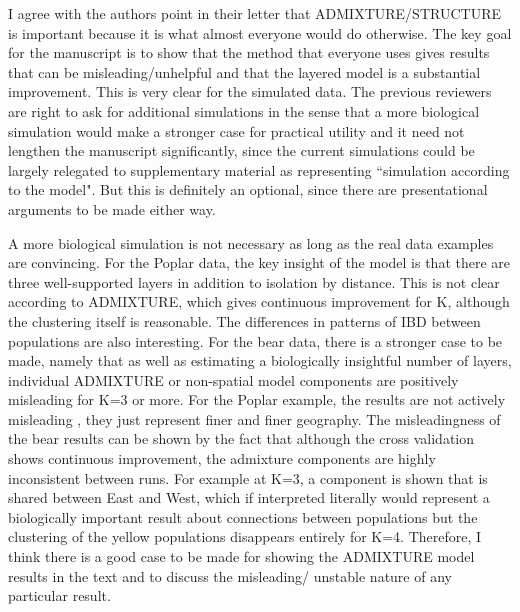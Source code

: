 \begin{point}{}
    I agree with the authors point in their letter that ADMIXTURE/STRUCTURE is important because it is what almost everyone would do otherwise.  The key goal for the manuscript is to show that the method that everyone uses gives results that can be misleading/unhelpful and that the layered model is a substantial improvement. This is very clear for the simulated data. The previous reviewers are right to ask for additional simulations in the sense that a more biological simulation would make a stronger case for practical utility and it need not lengthen the manuscript significantly, since the current simulations could be largely relegated to supplementary material as representing ``simulation according to the model". But this is definitely an optional, since there are presentational arguments to be made either way.
\end{point}


\begin{point}{}
    A more biological simulation is not necessary as long as the real data examples are convincing. For the Poplar data, the key insight of the model is that there are three well-supported layers in addition to isolation by distance. This is not clear according to ADMIXTURE, which gives continuous improvement for K, although the clustering itself is reasonable. The differences in patterns of IBD between populations are also interesting.  For the bear data, there is a stronger case to be made, namely that as well as estimating a biologically insightful number of layers, individual ADMIXTURE or non-spatial model components are positively misleading for K=3 or more. For the Poplar example, the results are not actively misleading , they just represent finer and finer geography. The misleadingness of the bear results can be shown by the fact that although the cross validation shows continuous improvement, the admixture components are highly inconsistent between runs. For example at K=3, a component is shown that is shared between East and West, which if interpreted literally would represent a biologically important result about connections between populations but the clustering of the yellow populations disappears entirely for K=4. Therefore, I think there is a good case to be made for showing the ADMIXTURE model results in the text and to discuss the misleading/ unstable nature of any particular result.
\end{point}

